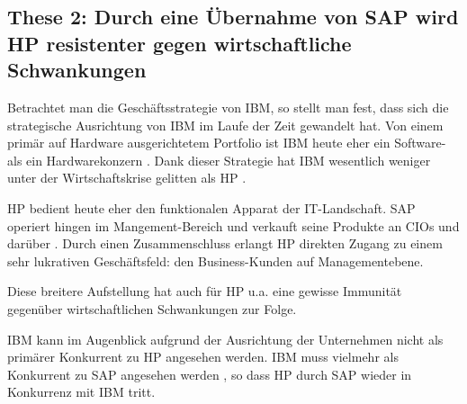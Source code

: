 \documentclass[a4paper,10pt,left=1.5cm,right=1.5cm,top=1.5cm,bottom=1.5cm]{article}
\begin{document}
\subsection*{These 2: Durch eine Übernahme von SAP wird HP resistenter gegen wirtschaftliche Schwankungen}

Betrachtet man die Geschäftsstrategie von IBM, so stellt man fest, dass sich die strategische Ausrichtung von IBM im Laufe der Zeit gewandelt hat.
Von einem primär auf Hardware ausgerichtetem Portfolio ist IBM heute eher ein Software- als ein Hardwarekonzern \cite{ibmvshp}.
Dank dieser Strategie hat IBM wesentlich weniger unter der Wirtschaftskrise gelitten als HP \cite{ibmvshp}.

HP bedient heute eher den funktionalen Apparat der IT-Landschaft.
SAP operiert hingen im Mangement-Bereich und verkauft seine Produkte an CIOs und darüber \cite{cioandabove}.
Durch einen Zusammenschluss erlangt HP direkten Zugang zu einem sehr lukrativen Geschäftsfeld: den Business-Kunden auf Managementebene.

Diese breitere Aufstellung hat auch für HP u.a. eine gewisse Immunität gegenüber wirtschaftlichen Schwankungen zur Folge.

IBM kann im Augenblick aufgrund der Ausrichtung der Unternehmen nicht als primärer Konkurrent zu HP angesehen werden.
IBM muss vielmehr als Konkurrent zu SAP angesehen werden \cite{ibmvssap}, so dass HP durch SAP wieder in Konkurrenz mit IBM tritt.

%
%
%
%
%
%
%
%
%
\end{document}
